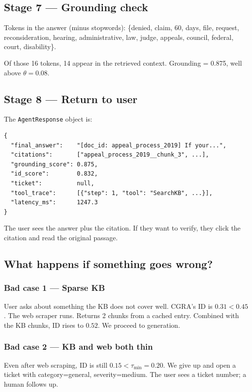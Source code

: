 \documentclass[11pt,a4paper]{article}
\begin{document}
\subsection{Stage 7 --- Grounding check}

Tokens in the answer (minus stopwords): \{denied, claim, 60, days, file, request, reconsideration, hearing, administrative, law, judge, appeals, council, federal, court, disability\}.

Of those 16 tokens, 14 appear in the retrieved context. Grounding = 0.875, well above $\theta=0.08$. 

\subsection{Stage 8 --- Return to user}

The \texttt{AgentResponse} object is:

\begin{lstlisting}
{
  "final_answer":    "[doc_id: appeal_process_2019] If your...",
  "citations":       ["appeal_process_2019__chunk_3", ...],
  "grounding_score": 0.875,
  "id_score":        0.832,
  "ticket":          null,
  "tool_trace":      [{"step": 1, "tool": "SearchKB", ...}],
  "latency_ms":      1247.3
}
\end{lstlisting}

The user sees the answer plus the citation. If they want to verify, they click the citation and read the original passage.

\subsection{What happens if something goes wrong?}

\subsubsection*{Bad case 1 --- Sparse KB}

User asks about something the KB does not cover well. CGRA's ID is $0.31 < 0.45$. The web scraper runs. Returns 2 chunks from a cached entry. Combined with the KB chunks, ID rises to $0.52$. We proceed to generation.

\subsubsection*{Bad case 2 --- KB and web both thin}

Even after web scraping, ID is still $0.15 < \tau_{\min}=0.20$. We give up and open a ticket with category=general, severity=medium. The user sees a ticket number; a human follows up.
\end{document}
